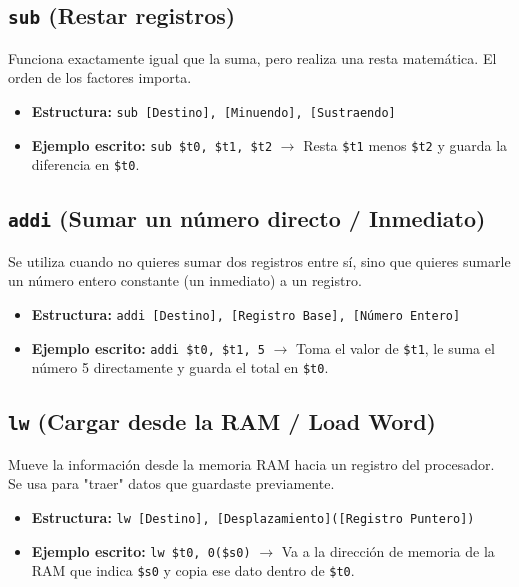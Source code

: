 \documentclass[12pt,a4paper]{article}
\begin{document}
\subsection{\texttt{sub} (Restar registros)}
Funciona exactamente igual que la suma, pero realiza una resta matemática. El orden de los factores importa.
\begin{itemize}
    \item \textbf{Estructura:} \texttt{sub [Destino], [Minuendo], [Sustraendo]}
    \item \textbf{Ejemplo escrito:} \texttt{sub \$t0, \$t1, \$t2} $\rightarrow$ Resta \texttt{\$t1} menos \texttt{\$t2} y guarda la diferencia en \texttt{\$t0}.
\end{itemize}

\subsection{\texttt{addi} (Sumar un número directo / Inmediato)}
Se utiliza cuando no quieres sumar dos registros entre sí, sino que quieres sumarle un número entero constante (un inmediato) a un registro.
\begin{itemize}
    \item \textbf{Estructura:} \texttt{addi [Destino], [Registro Base], [Número Entero]}
    \item \textbf{Ejemplo escrito:} \texttt{addi \$t0, \$t1, 5} $\rightarrow$ Toma el valor de \texttt{\$t1}, le suma el número 5 directamente y guarda el total en \texttt{\$t0}.
\end{itemize}

\subsection{\texttt{lw} (Cargar desde la RAM / Load Word)}
Mueve la información desde la memoria RAM hacia un registro del procesador. Se usa para "traer" datos que guardaste previamente.
\begin{itemize}
    \item \textbf{Estructura:} \texttt{lw [Destino], [Desplazamiento]([Registro Puntero])}
    \item \textbf{Ejemplo escrito:} \texttt{lw \$t0, 0(\$s0)} $\rightarrow$ Va a la dirección de memoria de la RAM que indica \texttt{\$s0} y copia ese dato dentro de \texttt{\$t0}.
\end{itemize}
\end{document}
